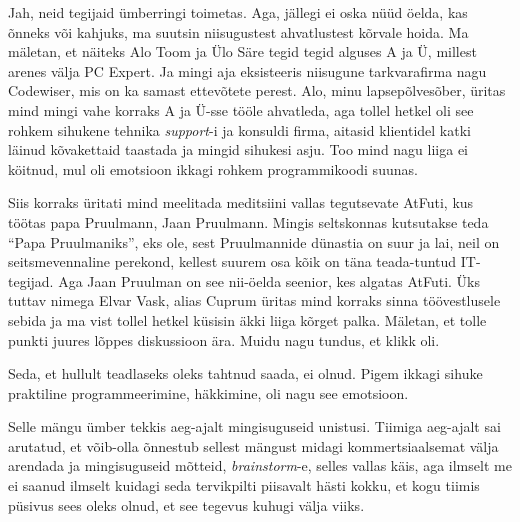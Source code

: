 Jah, neid tegijaid ümberringi toimetas. Aga, jällegi ei oska nüüd öelda, kas 
õnneks või kahjuks, ma suutsin niisugustest ahvatlustest  kõrvale hoida. Ma 
mäletan, et näiteks Alo Toom ja Ülo Säre tegid tegid alguses A ja Ü, millest arenes välja PC 
Expert.  Ja mingi aja eksisteeris niisugune tarkvarafirma 
nagu Codewiser, mis on ka samast  ettevõtete perest. Alo, minu 
 lapsepõlvesõber, üritas mind mingi vahe korraks A ja Ü-sse tööle ahvatleda, 
aga tollel hetkel  oli see rohkem sihukene tehnika \emph{support}-i ja konsuldi 
firma, aitasid klientidel katki läinud kõvakettaid taastada ja mingid sihukesi 
asju. Too mind nagu liiga ei köitnud, mul  oli emotsioon  ikkagi rohkem  
programmikoodi suunas. 

Siis korraks üritati mind meelitada meditsiini vallas tegutsevate 
AtFuti, kus töötas papa Pruulmann, Jaan 
Pruulmann. Mingis seltskonnas kutsutakse teda 
\enquote{Papa  Pruulmaniks}, eks ole, sest Pruulmannide dünastia on suur ja 
lai, neil on seitsmevennaline perekond, kellest suurem osa kõik on täna 
teada-tuntud IT-tegijad. Aga Jaan Pruulman on  see nii-öelda seenior, kes 
algatas AtFuti. Üks tuttav nimega Elvar Vask, alias 
Cuprum üritas mind korraks sinna 
töövestlusele sebida ja ma vist tollel hetkel küsisin  äkki liiga kõrget 
palka. Mäletan, et tolle punkti juures lõppes diskussioon ära. Muidu nagu 
tundus, et klikk oli. 


Seda, et hullult teadlaseks oleks tahtnud saada, ei olnud. Pigem ikkagi sihuke  
praktiline programmeerimine, häkkimine, oli nagu see emotsioon. 


Selle mängu ümber tekkis aeg-ajalt mingisuguseid unistusi. Tiimiga aeg-ajalt 
sai arutatud, et võib-olla õnnestub sellest mängust midagi kommertsiaalsemat 
välja arendada ja mingisuguseid mõtteid, \emph{brainstorm}-e, selles vallas käis, 
aga ilmselt me ei saanud ilmselt kuidagi seda tervikpilti piisavalt hästi 
kokku, et kogu tiimis püsivus sees oleks olnud, et see tegevus kuhugi välja 
viiks. 

